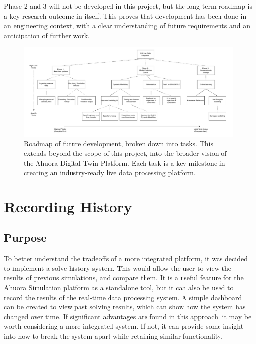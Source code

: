 \documentclass[12pt]{report}
\begin{document}
Phase 2 and 3 will not be developed in this project, but the long-term roadmap is a key research outcome in itself. This proves that development has been done in an engineering context, with a clear understanding of future requirements and an anticipation of further work.


\begin{landscape}
    \begin{figure}
        \centering
        \includegraphics[width=1.5\textwidth]{roadmap.pdf}
        \caption{Roadmap of future development, broken down into tasks. This extends beyond the scope of this project, into the broader vision of the Ahuora Digital Twin Platform. Each task is a key milestone in creating an industry-ready live data processing platform.}
        \label{fig:development_flowchart}
    \end{figure}
\end{landscape}

\chapter{Recording History} \label{sec:history}

\section{Purpose}

To better understand the tradeoffs of a more integrated platform, it was decided to implement a solve history system. This would allow the user to view the results of previous simulations, and compare them. It is a useful feature for the Ahuora Simulation platform as a standalone tool, but it can also be used to record the results of the real-time data processing system. A simple dashboard can be created to view past solving results, which can show how the system has changed over time. If significant advantages are found in this approach, it may be worth considering a more integrated system. If not, it can provide some insight into how to break the system apart while retaining similar functionality.
\end{document}
